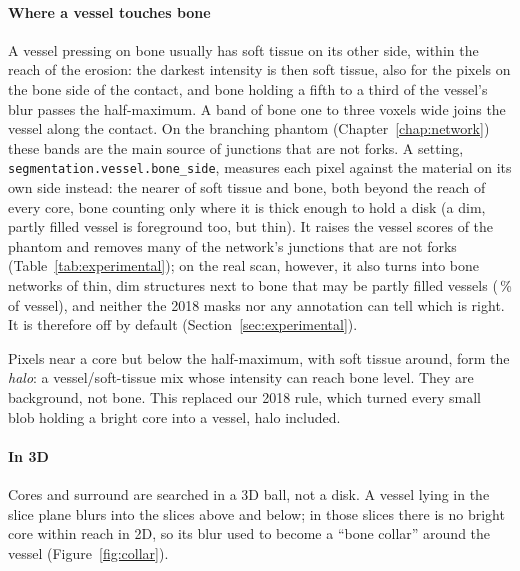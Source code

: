 \paragraph{Where a vessel touches bone} A vessel pressing on bone usually has soft tissue on its other
side, within the reach of the erosion: the darkest intensity is then soft tissue, also for the pixels
on the bone side of the contact, and bone holding a fifth to a third of the vessel's blur passes the
half-maximum.
A band of bone one to three voxels wide joins the vessel along the contact. On the branching phantom
(Chapter~\ref{chap:network}) these bands are the main source of junctions that are not forks. A
setting, \texttt{segmentation.vessel.bone\_side}, measures each pixel against the material on its own
side instead: the nearer of soft tissue and bone, both beyond the reach of every core, bone counting
only where it is thick enough to hold a \pbValueExpBoneSideBarrier\um{} disk (a dim, partly filled vessel is foreground too,
but thin). It raises the vessel scores of the phantom and removes many of the network's junctions that are not
forks (Table~\ref{tab:experimental}); on
the real scan, however, it also turns into bone networks of thin, dim structures next to bone that may
be partly filled vessels (\pbValueExpRealBoneSideVesselPct\,\% of vessel), and neither the 2018 masks
nor any annotation can tell which is right. It is therefore off by default
(Section~\ref{sec:experimental}).

Pixels near a core but below the half-maximum, with soft tissue around, form the \emph{halo}: a
vessel/soft-tissue mix whose intensity can reach bone level. They are background, not bone. This
replaced our 2018 rule, which turned every small blob holding a bright core into a vessel, halo
included.

\paragraph{In 3D} Cores and surround are searched in a 3D ball, not a disk. A vessel lying in the
slice plane blurs into the slices above and below; in those slices there is no bright core within
reach in 2D, so its blur used to become a ``bone collar'' around the vessel
(Figure~\ref{fig:collar}).

